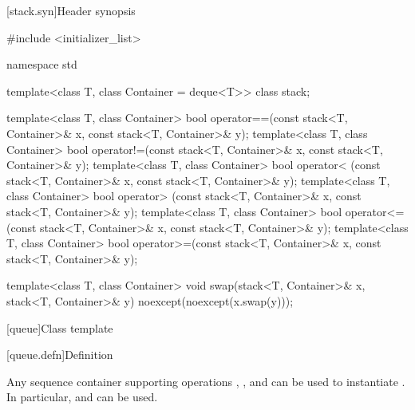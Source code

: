 [stack.syn]{Header  synopsis}%
%

\begin{codeblock}
#include <initializer_list>

namespace std {
  template<class T, class Container = deque<T>> class stack;

  template<class T, class Container>
    bool operator==(const stack<T, Container>& x, const stack<T, Container>& y);
  template<class T, class Container>
    bool operator!=(const stack<T, Container>& x, const stack<T, Container>& y);
  template<class T, class Container>
    bool operator< (const stack<T, Container>& x, const stack<T, Container>& y);
  template<class T, class Container>
    bool operator> (const stack<T, Container>& x, const stack<T, Container>& y);
  template<class T, class Container>
    bool operator<=(const stack<T, Container>& x, const stack<T, Container>& y);
  template<class T, class Container>
    bool operator>=(const stack<T, Container>& x, const stack<T, Container>& y);

  template<class T, class Container>
    void swap(stack<T, Container>& x, stack<T, Container>& y) noexcept(noexcept(x.swap(y)));
}
\end{codeblock}

[queue]{Class template }

[queue.defn]{Definition}

\pnum
{}%
Any sequence container supporting operations
,
,
and
can be used to instantiate
.
In particular,
and
can be used.

